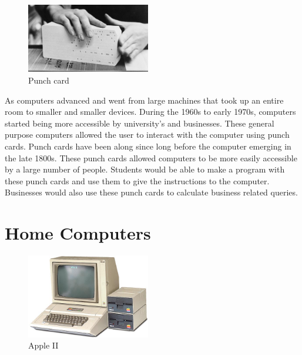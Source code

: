 \begin{figure}
  \begin{center}
    \includegraphics[width=0.48\textwidth]{img/punchcard.jpg}
  \end{center}
  \caption{Punch card}
\end{figure}

As computers advanced and went from large machines that took up an entire room to smaller and smaller devices. During the 1960s to early 1970s, computers started being more accessible by university's and businesses. These general purpose computers allowed the user to interact with the computer using punch cards. \cite{punchcard} Punch cards have been along since long before the computer emerging in the late 1800s. \cite{punchcard} These punch cards allowed computers to be more easily accessible by a large number of people. Students would be able to make a program with these punch cards and use them to give the instructions to the computer. Businesses would also use these punch cards to calculate business related queries.

\section{Home Computers}

\begin{figure}
  \begin{center}
    \includegraphics[width=0.48\textwidth]{img/appleii.jpg}
  \end{center}
  \caption{Apple II}
\end{figure}

